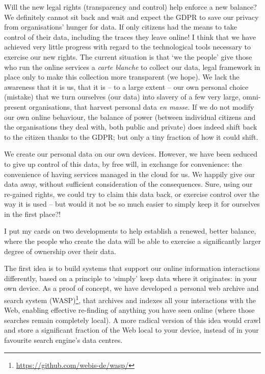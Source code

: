 \documentclass[a4paper,twoside,12pt]{article}
\begin{document}
Will the new legal rights (transparency and control) help enforce a new balance? We definitely cannot sit back and wait and expect the GDPR to save our privacy from organisations' hunger for data. If only citizens had the means to take control of their data, including the traces they leave online! I think that we have achieved very little progress with regard to the technological tools necessary to exercise our new rights. The current situation is that `we the people' give those who run the online services a \emph{carte blanche} to collect our data, legal framework in place only to make this collection more transparent (we hope). We lack the awareness that it is us, that it is -- to a large extent -- our own personal choice (mistake) that we turn ourselves (our data) into slavery of a few very large, omni-present organisations, that harvest personal data \emph{en masse}. If we do not modify our own online behaviour, the balance of power (between individual citizens and the organisations they deal with, both public and private) does indeed shift back to the citizen thanks to the GDPR; but only a tiny fraction of how it could shift.

We create our personal data on our own devices. However, we have been seduced to give up control of this data, by free will, in exchange for convenience: the convenience of having services managed in the cloud for us. We happily give our data away, without sufficient consideration of the consequences. Sure, using our re-gained rights, we could try to claim this data back, or exercise control over the way it is used -- but would it not be so much easier to simply keep it for ourselves in the first place?! 

I put my cards on two developments to help establish a renewed, better balance, where the people who create the data will be able to exercise a significantly larger degree of ownership over their data.

The first idea is to build systems that support our online information interactions differently, based on a principle to `simply' keep data where it originates: in your own device. As a proof of concept, we have developed a personal web archive and search system (WASP)\footnote{%
\url{https://github.com/webis-de/wasp/}},
that archives and indexes all your interactions with the Web, enabling effective re-finding of anything you have seen online (where those searches remain completely local). A more radical version of this idea would crawl and store a significant fraction of the Web local to your device, instead of in your favourite search engine's data centres.
\end{document}
